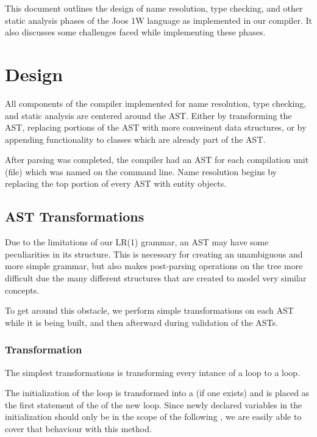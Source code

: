\documentclass[pdftex,11pt,a4paper]{article}
\begin{document}

This document outlines the design of name resolution, type checking,
and other static analysis phases of the Joos 1W language as
implemented in our compiler. It also discusses some challenges faced
while implementing these phases.


\section{Design}

All components of the compiler implemented for name resolution, type
checking, and static analysis are centered around the AST. Either by
transforming the AST, replacing portions of the AST with more
conveinent data structures, or by appending functionality to classes
which are already part of the AST.

After parsing was completed, the compiler had an AST for each
compilation unit (file) which was named on the command line. Name
resolution begins by replacing the top portion of every AST with
entity objects.

\subsection{AST Transformations}

Due to the limitations of our LR(1) grammar, an AST may have some
peculiarities in its structure. This is necessary for creating an
unambiguous and more simple grammar, but also makes post-parsing
operations on the tree more difficult due the many different
structures that are created to model very similar concepts.

To get around this obstacle, we perform simple transformations on each
AST while it is being built, and then afterward during validation of
the ASTs.

\subsubsection{ Transformation}

The simplest transformations is transforming every intance of a
 loop to a  loop.

The initialization of the  loop is transformed into a 
(if one exists) and is placed as the first statement of the  of
the new  loop. Since newly declared variables in the initialization
should only be in the scope of the following , we are easily able
to cover that behaviour with this method.
\end{document}
